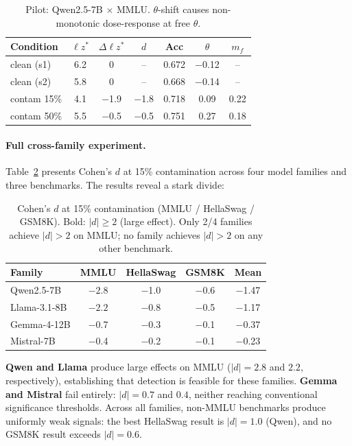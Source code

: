 \documentclass[11pt,a4paper]{article}
\newcommand{\lzstar}{\ensuremath{\ell z^*}}
\begin{document}
\begin{table}[t]
\centering
\small
\caption{Pilot: Qwen2.5-7B $\times$ MMLU. $\theta$-shift causes non-monotonic dose-response at free $\theta$.}
\label{tab:pilot}
\begin{tabular}{lcccccc}
\toprule
\textbf{Condition} & $\lzstar$ & $\Delta\lzstar$ & $d$ & \textbf{Acc} & $\theta$ & $m_f$ \\
\midrule
clean (s1) & 6.2 & 0 & -- & 0.672 & $-$0.12 & -- \\
clean (s2) & 5.8 & 0 & -- & 0.668 & $-$0.14 & -- \\
contam 15\% & 4.1 & $-$1.9 & $-$1.8 & 0.718 & 0.09 & 0.22 \\
contam 50\% & 5.5 & $-$0.5 & $-$0.5 & 0.751 & 0.27 & 0.18 \\
\bottomrule
\end{tabular}
\end{table}

\paragraph{Full cross-family experiment.}
Table~\ref{tab:cross_family_d} presents Cohen's $d$ at 15\% contamination across four model families and three benchmarks.
The results reveal a stark divide:

\begin{table}[t]
\centering
\small
\caption{Cohen's $d$ at 15\% contamination (MMLU / HellaSwag / GSM8K). Bold: $|d| \geq 2$ (large effect). Only 2/4 families achieve $|d|>2$ on MMLU; no family achieves $|d|>2$ on any other benchmark.}
\label{tab:cross_family_d}
\begin{tabular}{lcccc}
\toprule
\textbf{Family} & \textbf{MMLU} & \textbf{HellaSwag} & \textbf{GSM8K} & \textbf{Mean} \\
\midrule
Qwen2.5-7B & $\mathbf{-2.8}$ & $-$1.0 & $-$0.6 & $-$1.47 \\
Llama-3.1-8B & $\mathbf{-2.2}$ & $-$0.8 & $-$0.5 & $-$1.17 \\
Gemma-4-12B & $-$0.7 & $-$0.3 & $-$0.1 & $-$0.37 \\
Mistral-7B & $-$0.4 & $-$0.2 & $-$0.1 & $-$0.23 \\
\bottomrule
\end{tabular}
\end{table}

\textbf{Qwen and Llama} produce large effects on MMLU ($|d|=2.8$ and $2.2$, respectively), establishing that detection is feasible for these families.
\textbf{Gemma and Mistral} fail entirely: $|d|=0.7$ and $0.4$, neither reaching conventional significance thresholds.
Across all families, non-MMLU benchmarks produce uniformly weak signals: the best HellaSwag result is $|d|=1.0$ (Qwen), and no GSM8K result exceeds $|d|=0.6$.
\end{document}
